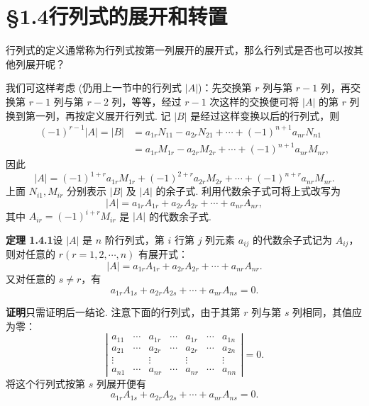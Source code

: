 \documentclass[UTF8, 12pt, fontset=fandol, oneside]{ctexart}
\begin{document}
\section*{§1.4\quad 行列式的展开和转置}

行列式的定义通常称为行列式按第一列展开的展开式，那么行列式是否也可以按其他列展开呢？

我们可这样考虑 (仍用上一节中的行列式 $|A|$)：先交换第 $r$ 列与第 $r-1$ 列，再交换第 $r-1$ 列与第 $r-2$ 列，等等，经过 $r-1$ 次这样的交换便可将 $|A|$ 的第 $r$ 列换到第一列，再按定义展开行列式. 记 $|B|$ 是经过这样变换以后的行列式，则
\[
\begin{aligned}
(-1)^{r-1}|A|=|B|
&=a_{1r}N_{11}-a_{2r}N_{21}+\cdots+(-1)^{n+1}a_{nr}N_{n1}\\
&=a_{1r}M_{1r}-a_{2r}M_{2r}+\cdots+(-1)^{n+1}a_{nr}M_{nr},
\end{aligned}
\]
因此
\begin{equation}
|A|=(-1)^{1+r}a_{1r}M_{1r}+(-1)^{2+r}a_{2r}M_{2r}+\cdots+(-1)^{n+r}a_{nr}M_{nr}.
\tag{1.4.1}
\end{equation}
上面 $N_{i1},M_{ir}$ 分别表示 $|B|$ 及 $|A|$ 的余子式. 利用代数余子式可将上式改写为
\begin{equation}
|A|=a_{1r}A_{1r}+a_{2r}A_{2r}+\cdots+a_{nr}A_{nr},
\tag{1.4.2}
\end{equation}
其中 $A_{ir}=(-1)^{i+r}M_{ir}$ 是 $|A|$ 的代数余子式.

\noindent\textbf{定理 1.4.1}\quad 设 $|A|$ 是 $n$ 阶行列式，第 $i$ 行第 $j$ 列元素 $a_{ij}$ 的代数余子式记为 $A_{ij}$，则对任意的 $r(r=1,2,\cdots,n)$ 有展开式：
\begin{equation}
|A|=a_{1r}A_{1r}+a_{2r}A_{2r}+\cdots+a_{nr}A_{nr}.
\tag{1.4.3}
\end{equation}
又对任意的 $s\ne r$，有
\begin{equation}
a_{1r}A_{1s}+a_{2r}A_{2s}+\cdots+a_{nr}A_{ns}=0.
\tag{1.4.4}
\end{equation}

\noindent\textbf{证明}\quad 只需证明后一结论. 注意下面的行列式，由于其第 $r$ 列与第 $s$ 列相同，其值应为零：
\[
\left|\begin{array}{ccccccc}
a_{11} & \cdots & a_{1r} & \cdots & a_{1r} & \cdots & a_{1n}\\
a_{21} & \cdots & a_{2r} & \cdots & a_{2r} & \cdots & a_{2n}\\
\vdots & & \vdots & & \vdots & & \vdots\\
a_{n1} & \cdots & a_{nr} & \cdots & a_{nr} & \cdots & a_{nn}
\end{array}\right|=0.
\]
将这个行列式按第 $s$ 列展开便有
\[
a_{1r}A_{1s}+a_{2r}A_{2s}+\cdots+a_{nr}A_{ns}=0.
\]
\end{document}
